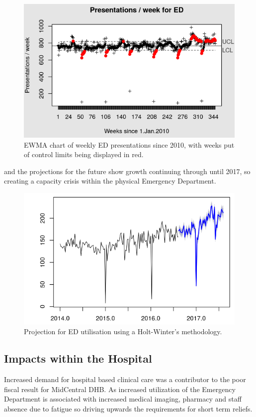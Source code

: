 \documentclass[11pt,a4paper]{article}
\begin{document}
\begin{figure}[htp]
\centering
\includegraphics[scale=0.70]{EWMA_ED_pesentations.png}
\caption{EWMA chart of weekly ED presentations since 2010, with weeks put of control limits being displayed in red.}
\label{EWMA statistical process chart of ED presentations}
\end{figure}

and the projections for the future show growth continuing through until 2017, so creating a capacity crisis within the physical Emergency Department.\\

\begin{figure}[htp]
\centering
\includegraphics[scale=0.70]{HW_projections.png}
\caption{Projection for ED utilisation using a Holt-Winter's methodology.}
\label{Projections for ED utilisation through to 2017}
\end{figure}

\subsection{Impacts within the Hospital}
Increased demand for hospital based clinical care was a contributor to the poor fiscal result for MidCentral DHB. As increased utilization of the Emergency Department is associated with increased medical imaging, pharmacy and staff absence due to fatigue so driving upwards the requirements for short term reliefs.\\
\end{document}
